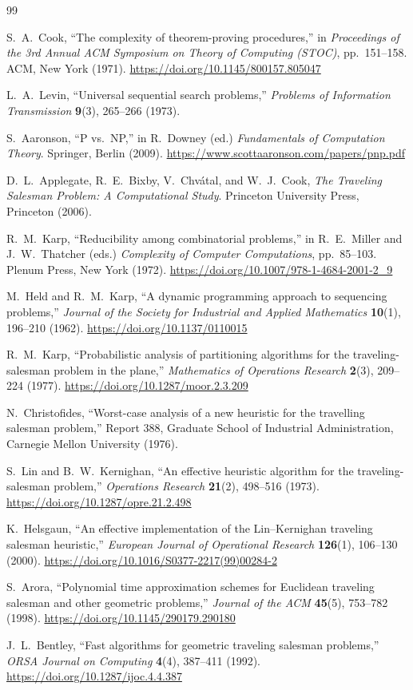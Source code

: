 \documentclass[11pt,a4paper]{article}
\begin{document}
\begin{thebibliography}{99}\small

S.~A.~Cook, ``The complexity of theorem-proving procedures,''
in \emph{Proceedings of the 3rd Annual ACM Symposium on Theory of
Computing (STOC)}, pp.~151--158. ACM, New York (1971).
\url{https://doi.org/10.1145/800157.805047}

L.~A.~Levin, ``Universal sequential search problems,''
\emph{Problems of Information Transmission} \textbf{9}(3), 265--266 (1973).

S.~Aaronson, ``P vs.\ NP,''
in R.~Downey (ed.) \emph{Fundamentals of Computation Theory}.
Springer, Berlin (2009).
\url{https://www.scottaaronson.com/papers/pnp.pdf}

D.~L.~Applegate, R.~E.~Bixby, V.~Chv\'atal, and W.~J.~Cook,
\emph{The Traveling Salesman Problem: A Computational Study}.
Princeton University Press, Princeton (2006).

R.~M.~Karp, ``Reducibility among combinatorial problems,''
in R.~E.~Miller and J.~W.~Thatcher (eds.) \emph{Complexity of Computer
Computations}, pp.~85--103. Plenum Press, New York (1972).
\url{https://doi.org/10.1007/978-1-4684-2001-2_9}

M.~Held and R.~M.~Karp, ``A dynamic programming approach to
sequencing problems,''
\emph{Journal of the Society for Industrial and Applied Mathematics}
\textbf{10}(1), 196--210 (1962).
\url{https://doi.org/10.1137/0110015}

R.~M.~Karp, ``Probabilistic analysis of partitioning algorithms for
the traveling-salesman problem in the plane,''
\emph{Mathematics of Operations Research} \textbf{2}(3), 209--224 (1977).
\url{https://doi.org/10.1287/moor.2.3.209}

N.~Christofides, ``Worst-case analysis of a new heuristic for the
travelling salesman problem,''
Report 388, Graduate School of Industrial Administration,
Carnegie Mellon University (1976).

S.~Lin and B.~W.~Kernighan, ``An effective heuristic algorithm for
the traveling-salesman problem,''
\emph{Operations Research} \textbf{21}(2), 498--516 (1973).
\url{https://doi.org/10.1287/opre.21.2.498}

K.~Helsgaun, ``An effective implementation of the Lin--Kernighan
traveling salesman heuristic,''
\emph{European Journal of Operational Research} \textbf{126}(1),
106--130 (2000).
\url{https://doi.org/10.1016/S0377-2217(99)00284-2}

S.~Arora, ``Polynomial time approximation schemes for Euclidean
traveling salesman and other geometric problems,''
\emph{Journal of the ACM} \textbf{45}(5), 753--782 (1998).
\url{https://doi.org/10.1145/290179.290180}

J.~L.~Bentley, ``Fast algorithms for geometric traveling salesman
problems,''
\emph{ORSA Journal on Computing} \textbf{4}(4), 387--411 (1992).
\url{https://doi.org/10.1287/ijoc.4.4.387}

\end{thebibliography}
\end{document}
